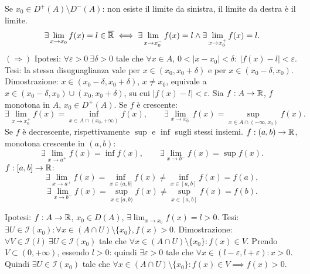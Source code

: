 Se $x_0\in D^+(A)\setminus D^-(A)$: non esiste il limite da sinistra, il limite da destra è il limite.
\[\exists\lim_{x\to x_0}f(x)=l\in\overline{\mathbb R}\iff
\exists\lim_{x\to x_0^-}f(x)=l\land\exists\lim_{x\to x_0^+}f(x)=l.\]
$(\Rightarrow)$ Ipotesi: $\forall\varepsilon>0\ \exists\delta>0$ tale che $\forall x\in A$, $0<|x-x_0|<\delta:\ |f(x)-l|<\varepsilon$.
Tesi: la stessa disuguaglianza vale per $x\in(x_0,x_0+\delta)$ e per $x\in(x_0-\delta,x_0)$.
Dimostrazione: $x\in(x_0-\delta,x_0+\delta)$, $x\ne x_0$, equivale a
$x\in(x_0-\delta,x_0)\cup(x_0,x_0+\delta)$, su cui $|f(x)-l|<\varepsilon$.
Sia $f:A\to\mathbb R$, $f$ monotona in $A$, $x_0\in D^+(A)$.
Se $f$ è crescente:
\[\exists\lim_{x\to x_0^+}f(x)=\inf_{x\in A\cap(x_0,+\infty)}f(x),\qquad
\exists\lim_{x\to x_0^-}f(x)=\sup_{x\in A\cap(-\infty,x_0)}f(x).\]
Se $f$ è decrescente, rispettivamente $\sup$ e $\inf$ sugli stessi insiemi.
$f:(a,b)\to\mathbb R$, monotona crescente in $(a,b)$:
\[\exists\lim_{x\to a^+}f(x)=\inf f(x),\qquad\exists\lim_{x\to b^-}f(x)=\sup f(x).\]
$f:[a,b]\to\mathbb R$:
\[\exists\lim_{x\to a^+}f(x)=\inf_{x\in(a,b]}f(x)\ne\inf_{x\in[a,b]}f(x)=f(a),\]
\[\exists\lim_{x\to b^-}f(x)=\sup_{x\in[a,b)}f(x)\ne\sup_{x\in[a,b]}f(x)=f(b).\]
\begin{center}\end{center}
Ipotesi: $f:A\to\mathbb R$, $x_0\in D(A)$, $\exists\lim_{x\to x_0}f(x)=l>0$.
Tesi: $\exists U\in\mathcal I(x_0):\forall x\in(A\cap U)\setminus\{x_0\},f(x)>0$.
Dimostrazione: $\forall V\in\mathcal I(l)\ \exists U\in\mathcal I(x_0)$ tale che $\forall x\in(A\cap U)\setminus\{x_0\}:f(x)\in V$.
Prendo $V\subset(0,+\infty)$, essendo $l>0$: quindi $\exists\varepsilon>0$ tale che $\forall x\in(l-\varepsilon,l+\varepsilon):x>0$.
Quindi $\exists U\in\mathcal I(x_0)$ tale che $\forall x\in(A\cap U)\setminus\{x_0\}:f(x)\in V\implies f(x)>0$.
